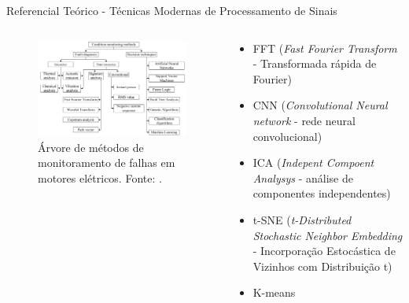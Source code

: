 \documentclass[aspectratio=169]{beamer}
\begin{document}

\begin{frame}{Referencial Teórico - Técnicas Modernas de Processamento de Sinais}
	\begin{columns}
    	\begin{column}{0.50\textwidth}
			\begin{figure}[HT]
				\begin{center}
					\includegraphics[scale=.27]{../referencial/img/monitoring_methods_rilski_p78.png}
					\caption{Árvore de métodos de monitoramento de falhas em motores elétricos. \newline
					Fonte: .} 
					\label{fig:monitoring_methods_rilski_p78}
				\end{center}
			\end{figure}
     	\end{column}
		
		\begin{column}{0.5\textwidth}
			\begin{itemize}
				\item FFT (\textit{Fast Fourier Transform} - Transformada rápida de Fourier)
				\item CNN (\textit{Convolutional Neural network} - rede neural convolucional)
				\item ICA (\textit{Indepent Compoent Analysys} - análise de componentes independentes)
				\item t-SNE (\textit{t-Distributed Stochastic Neighbor Embedding} - Incorporação Estocástica de Vizinhos com
				Distribuição t)
				\item K-means 
			\end{itemize}			
	 	\end{column}
	 \end{columns}
\end{frame}
\end{document}
